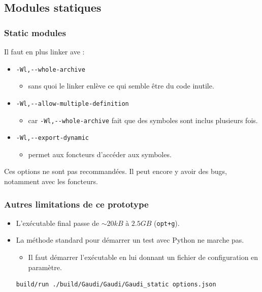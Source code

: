 \documentclass{beamer}
\begin{document}
\subsection{Modules statiques}

\begin{frame}[fragile]
    \frametitle{Static modules}

    Il faut en plus linker ave :
    \begin{itemize}
        \item \verb'-Wl,--whole-archive'
              \begin{itemize}
                  \item sans quoi le linker enlève ce qui semble être du code inutile.
              \end{itemize}
        \item \verb'-Wl,--allow-multiple-definition'
              \begin{itemize}
                  \item car \verb'-Wl,--whole-archive' fait que des symboles sont inclus plusieurs fois.
              \end{itemize}
        \item \verb'-Wl,--export-dynamic'
              \begin{itemize}
                  \item permet aux foncteurs d'accéder aux symboles.
              \end{itemize}
    \end{itemize}

    Ces options ne sont pas recommandées.
    Il peut encore y avoir des bugs, notamment avec les foncteurs.
\end{frame}

\begin{frame}[fragile]
    \frametitle{Autres limitations de ce prototype}

    \begin{itemize}
        \item L'exécutable final passe de $ \sim 20 kB $ à $ 2.5 GB $ (\verb'opt+g').
        \item La méthode standard pour démarrer un test avec Python ne marche pas.
              \begin{itemize}
                  \item Il faut démarrer l'exécutable en lui donnant un fichier de configuration en paramètre.
              \end{itemize}
              \begin{lstlisting}[language=bash,basicstyle=\scriptsize,breaklines]
build/run ./build/Gaudi/Gaudi/Gaudi_static options.json
            \end{lstlisting}
    \end{itemize}
\end{frame}
\end{document}
